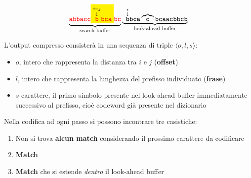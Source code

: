 \[
\underbrace{
    \text{\textcolor{red}{\texttt{abbacc}}}
    \text{\colorbox{yellow}{%
        $\overset{
            \substack{
                \leftarrow j \\ \downarrow
            }
        }{
            \text{\textcolor{red}{\texttt{b}}}
        }$%
        \textcolor{red}{\texttt{bca}}%
    }}
    \text{\textcolor{red}{\texttt{bc}}}
}_{\text{search buffer}}
\underbrace{
    \text{\texttt{\ }}
    \overset{  %
        \substack{
            i \\ \downarrow
        }
    }{
        \text{\texttt{\textbf{b}}}
    }%
    \text{\texttt{\textbf{bca}}}
    \overbrace{\text{\texttt{c}}} \text{\texttt{bcaacbbcb}}
}_{\text{look-ahead buffer}}
\]

L'output compresso consisterà in una sequenza di triple $\langle o,l,s \rangle$:
\begin{itemize}
    \item $o$, intero che rappresenta la distanza tra $i$ e $j$ (\textbf{offset})
    \item $l$, intero che rappresenta la lunghezza del prefisso individuato (\textbf{frase})
    \item $s$ carattere, il primo simbolo presente nel look-ahead buffer immediatamente successivo al prefisso, cioè codeword già presente nel dizionario
\end{itemize}

Nella codifica ad ogni passo si possono incontrare tre casistiche:
\begin{enumerate}
    \item Non si trova \textbf{alcun match} considerando il prossimo carattere da codificare
    \item \textbf{Match}
    \item \textbf{Match} che si estende \textit{dentro} il look-ahead buffer
\end{enumerate}

